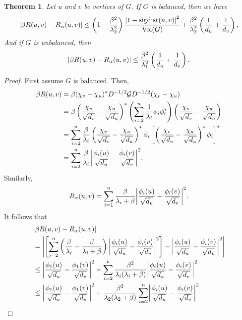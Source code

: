 \documentclass{article}
\newtheorem{thm}{Theorem}
\theoremstyle{definition}
\DeclarePairedDelimiter\abs{\lvert}{\rvert}
\DeclareMathOperator{\sigdist}{sigdist}
\DeclareMathOperator{\vol}{Vol}
\newcommand{\green}{\mathcal{G}}
\begin{document}
\begin{thm}\label{bound on effective resistance}
Let $u$ and $v$ be vertices of $G$. If $G$ is balanced, then we have
$$
\abs*{\beta R(u, v) - R_\alpha (u, v)}
\leq \left( 1 - \frac{\beta^2}{\lambda_2^2} \right) \frac{\abs*{1 - \sigdist(u, v)}^2}{\vol(G)} + \frac{\beta^2}{\lambda_2^2}\left( \frac{1}{d_u} + \frac{1}{d_v} \right),
$$
And if $G$ is unbalanced, then
$$
\abs*{\beta R(u, v) - R_\alpha (u, v)}
\leq \frac{\beta^2}{\lambda_1^2}\left( \frac{1}{d_u} + \frac{1}{d_v} \right).
$$
\end{thm}
\begin{proof}
First assume $G$ is balanced. Then,
\begin{align*}
\beta R(u, v) 
&= \beta (\chi_v - \chi_u)^* D^{-1/2} \green D^{-1/2} (\chi_v - \chi_u) \\
&= \beta \left( \frac{\chi_v}{\sqrt{d_v}} - \frac{\chi_u}{\sqrt{d_u}} \right)^* \left( \sum_{i=2}^n \frac{1}{\lambda_i} \phi_i \phi_i^* \right) \left( \frac{\chi_v}{\sqrt{d_v}} - \frac{\chi_u}{\sqrt{d_u}} \right) \\
&= \sum_{i=2}^n \frac{\beta}{\lambda_i} \left( \frac{\chi_v}{\sqrt{d_v}} - \frac{\chi_u}{\sqrt{d_u}} \right)^* \phi_i \left[ \left( \frac{\chi_v}{\sqrt{d_v}} - \frac{\chi_u}{\sqrt{d_u}} \right)^* \phi_i \right]^* \\
&= \sum_{i=2}^n \frac{\beta}{\lambda_i} \abs*{\frac{\phi_i(u)}{\sqrt{d_u}} - \frac{\phi_i(v)}{\sqrt{d_v}}}^2.
\end{align*}
Similarly,
$$
R_\alpha(u, v) = \sum_{i=1}^n \frac{\beta}{\lambda_i + \beta} \abs*{\frac{\phi_i(u)}{\sqrt{d_u}} - \frac{\phi_i(v)}{\sqrt{d_v}}}^2.
$$
It follows that
\begin{align*}
&\abs*{\beta R(u, v) - R_\alpha (u, v)} \\
&= \abs*{\left[ \sum_{i=2}^n \left( \frac{\beta}{\lambda_i} - \frac{\beta}{\lambda_i + \beta} \right) \abs*{\frac{\phi_i(u)}{\sqrt{d_u}} - \frac{\phi_i(v)}{\sqrt{d_v}}}^2 \right] - \abs*{\frac{\phi_i(u)}{\sqrt{d_u}} - \frac{\phi_i(v)}{\sqrt{d_v}}}^2} \\
&\leq \abs*{\frac{\phi_1(u)}{\sqrt{d_u}} - \frac{\phi_1(v)}{\sqrt{d_v}}}^2 + \sum_{i=2}^n \frac{\beta^2}{\lambda_i(\lambda_i + \beta)} \abs*{\frac{\phi_i(u)}{\sqrt{d_u}} - \frac{\phi_i(v)}{\sqrt{d_v}}}^2 \\
&\leq \abs*{\frac{\phi_1(u)}{\sqrt{d_u}} - \frac{\phi_1(v)}{\sqrt{d_v}}}^2 + \frac{\beta^2}{\lambda_2(\lambda_2 + \beta)} \sum_{i=2}^n \abs*{\frac{\phi_i(u)}{\sqrt{d_u}} - \frac{\phi_i(v)}{\sqrt{d_v}}}^2 \\

\end{align*}
\end{proof}
\end{document}
